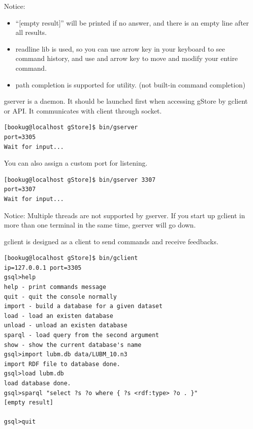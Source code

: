\documentclass[titlepage, a4paper, 12pt]{article}
\begin{document}
Notice:

\begin{itemize}
\item
  ``{[}empty result{]}'' will be printed if no answer, and there is an
  empty line after all results.
\item
  readline lib is used, so you can use arrow key in your keyboard to see
  command history, and use and arrow key to move and modify your entire
  command.
\item
  path completion is supported for utility. (not built-in command
  completion)
\end{itemize}


gserver is a daemon. It should be launched first when accessing gStore
by gclient or API. It communicates with client through socket.

\begin{verbatim}
[bookug@localhost gStore]$ bin/gserver
port=3305
Wait for input...
\end{verbatim}

You can also assign a custom port for listening.

\begin{verbatim}
[bookug@localhost gStore]$ bin/gserver 3307
port=3307
Wait for input...
\end{verbatim}

Notice: Multiple threads are not supported by gserver. If you start up
gclient in more than one terminal in the same time, gserver will go
down.


gclient is designed as a client to send commands and receive feedbacks.

\begin{verbatim}
[bookug@localhost gStore]$ bin/gclient
ip=127.0.0.1 port=3305
gsql>help
help - print commands message
quit - quit the console normally
import - build a database for a given dataset
load - load an existen database
unload - unload an existen database
sparql - load query from the second argument
show - show the current database's name
gsql>import lubm.db data/LUBM_10.n3
import RDF file to database done.
gsql>load lubm.db
load database done.
gsql>sparql "select ?s ?o where { ?s <rdf:type> ?o . }"
[empty result]

gsql>quit
\end{verbatim}
\end{document}
